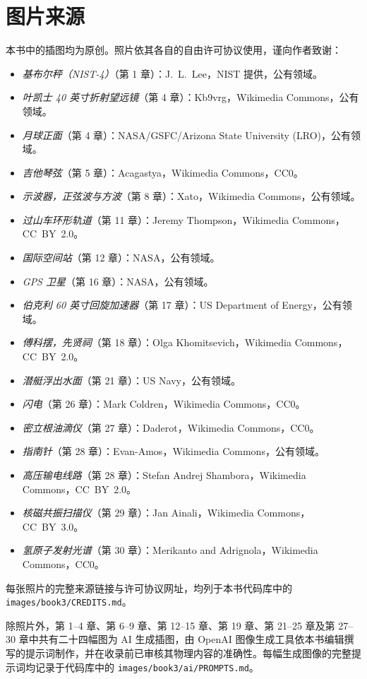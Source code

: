 \chapter*{图片来源}

本书中的插图均为原创。照片依其各自的自由许可协议使用，谨向作者致谢：

\begin{itemize}
  \item \emph{基布尔秤（NIST-4）}（第 1 章）：J.~L.~Lee，NIST 提供，公有领域。
  \item \emph{叶凯士 40 英寸折射望远镜}（第 4 章）：Kb9vrg，Wikimedia Commons，公有领域。
  \item \emph{月球正面}（第 4 章）：NASA/GSFC/Arizona State University (LRO)，公有领域。
  \item \emph{吉他琴弦}（第 5 章）：Acagastya，Wikimedia Commons，CC0。
  \item \emph{示波器，正弦波与方波}（第 8 章）：Xato，Wikimedia Commons，公有领域。
  \item \emph{过山车环形轨道}（第 11 章）：Jeremy Thompson，Wikimedia Commons，CC~BY~2.0。
  \item \emph{国际空间站}（第 12 章）：NASA，公有领域。
  \item \emph{GPS 卫星}（第 16 章）：NASA，公有领域。
  \item \emph{伯克利 60 英寸回旋加速器}（第 17 章）：US Department of Energy，公有领域。
  \item \emph{傅科摆，先贤祠}（第 18 章）：Olga Khomitsevich，Wikimedia Commons，CC~BY~2.0。
  \item \emph{潜艇浮出水面}（第 21 章）：US Navy，公有领域。
  \item \emph{闪电}（第 26 章）：Mark Coldren，Wikimedia Commons，CC0。
  \item \emph{密立根油滴仪}（第 27 章）：Daderot，Wikimedia Commons，CC0。
  \item \emph{指南针}（第 28 章）：Evan-Amos，Wikimedia Commons，公有领域。
  \item \emph{高压输电线路}（第 28 章）：Stefan Andrej Shambora，Wikimedia Commons，CC~BY~2.0。
  \item \emph{核磁共振扫描仪}（第 29 章）：Jan Ainali，Wikimedia Commons，CC~BY~3.0。
  \item \emph{氢原子发射光谱}（第 30 章）：Merikanto and Adrignola，Wikimedia Commons，CC0。
\end{itemize}

每张照片的完整来源链接与许可协议网址，均列于本书代码库中的 \texttt{images/book3/CREDITS.md}。

\bigskip
除照片外，第 1--4 章、第 6--9 章、第 12--15 章、第 19 章、第 21--25 章及第 27--30 章中共有二十四幅图为 AI 生成插图，由 OpenAI 图像生成工具依本书编辑撰写的提示词制作，并在收录前已审核其物理内容的准确性。每幅生成图像的完整提示词均记录于代码库中的 \texttt{images/book3/ai/PROMPTS.md}。
\clearpage
